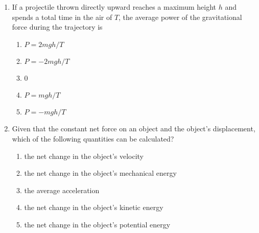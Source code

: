 \documentclass{../../../oss-apphys}
\begin{document}
\begin{multicols}{2}
\begin{enumerate}[leftmargin=18pt,resume]
%
%
%
    
  \item If a projectile thrown directly upward reaches a maximum height $h$ and
    spends a total time in the air of $T$, the average power of the
    gravitational force during the trajectory is
    \begin{enumerate}[nosep,label=(\Alph*)]
    \item $P=2mgh/T$
    \item $P=-2mgh/T$
    \item 0
    \item $P=mgh/T$
    \item $P=-mgh/T$
    \end{enumerate}

  \item Given that the constant net force on an object and the object's 
    displacement, which of the following quantities can be calculated?
    \begin{enumerate}[nosep,label=(\Alph*)]
    \item the net change in the object's velocity
    \item the net change in the object's mechanical energy
    \item the average acceleration
    \item the net change in the object's kinetic energy
    \item the net change in the object's potential energy
    \end{enumerate}
    \vspace{.8in}
    

\end{enumerate}
\end{multicols}
\end{document}
